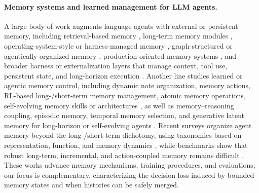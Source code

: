 \documentclass{article}
\theoremstyle{plain}
\theoremstyle{definition}
\theoremstyle{remark}
\begin{document}
\paragraph{Memory systems and learned management for LLM agents.}

A large body of work augments language agents with external or persistent memory, including retrieval-based memory \citep{lewis2021retrievalaugmentedgenerationknowledgeintensivenlp}, long-term memory modules \citep{NEURIPS2023_ebd82705}, operating-system-style or harness-managed memory \citep{packer2024memgptllmsoperatingsystems,kang-etal-2025-memory,Rafique2026ClawVMHV}, graph-structured or agentically organized memory \citep{gutiérrez2025hipporagneurobiologicallyinspiredlongterm,xu2025amemagenticmemoryllm}, production-oriented memory systems \citep{chhikara2025mem0buildingproductionreadyai}, and broader harness or externalization layers that manage context, tool use, persistent state, and long-horizon execution \citep{pan2026naturallanguageagentharnesses,lee2026metaharnessendtoendoptimizationmodel,zhou2026externalizationllmagentsunified}. 
Another line studies learned or agentic memory control, including dynamic note organization, memory actions, RL-based long-/short-term memory management, atomic memory operations, self-evolving memory skills or architectures \citep{xu2025amemagenticmemoryllm,zhang2026memoryactionautonomouscontext,yu2026agenticmemorylearningunified,huo2026atommemlearnabledynamic,zhang2026memskilllearningevolvingmemory,zhang2025memevolvemetaevolutionagentmemory}, as well as memory--reasoning coupling, episodic memory, temporal memory selection, and generative latent memory for long-horizon or self-evolving agents \citep{zhou2026mem,shu2026remem,du2026memoryt,zhang2026memgen}. 
Recent surveys organize agent memory beyond the long-/short-term dichotomy, using taxonomies based on representation, function, and memory dynamics \citep{zhang2024surveymemorymechanismlarge,hu2026memoryageaiagents,du2026memoryautonomousllmagentsmechanisms}, while benchmarks show that robust long-term, incremental, and action-coupled memory remains difficult \citep{maharana-etal-2024-evaluating,wu2025longmemevalbenchmarkingchatassistants,hu2026evaluating,li2026locomoplusbeyondfactualcognitivememory,tan2025membenchcomprehensiveevaluationmemory,he2026memoryarenabenchmarkingagentmemory,shen2026mem2actbenchbenchmarkevaluatinglongterm}. 
These works advance memory mechanisms, training procedures, and evaluations; our focus is complementary, characterizing the decision loss induced by bounded memory states and when histories can be safely merged.
\end{document}
